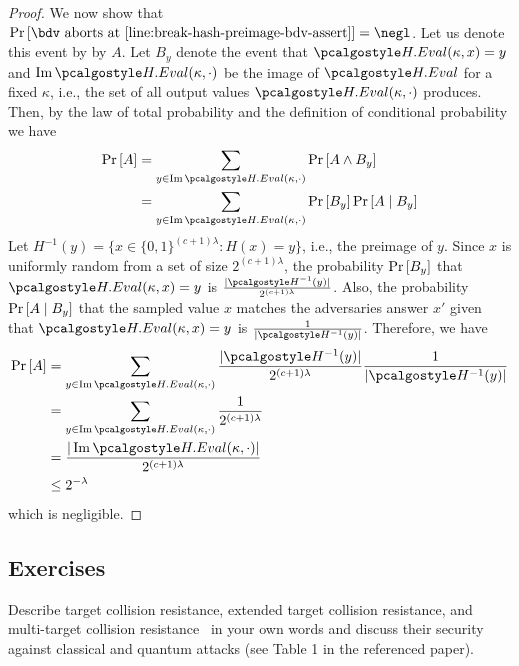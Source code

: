 \begin{proof}
  We now show that $\pr{\bdv \text{ aborts at \cref{line:break-hash-preimage-bdv-assert}} } = \negl$.
  Let us denote this event by by $A$.
  Let $B_y$ denote the event that $\algo{H.Eval}(\kappa, x) = y$ and $\Ima \algo{H.Eval}(\kappa, \cdot)$ be the image of $\algo{H.Eval}$ for a fixed $\kappa$, i.e., the set of all output values $\algo{H.Eval}(\kappa, \cdot)$ produces.
  Then, by the law of total probability and the definition of conditional probability we have
  \begin{align*}
    \pr{A} &= \sum_{y \in \Ima \algo{H.Eval}(\kappa, \cdot)} \pr{A \wedge B_y} \\
           &= \sum_{y \in \Ima \algo{H.Eval}(\kappa, \cdot)} \pr{B_y} \pr{A \mid B_y}
  \end{align*}
  Let $H^{-1}(y) = \{x \in \{0, 1\}^{(c+1)\lambda} : H(x) = y\}$, i.e., the preimage of $y$.
  Since $x$ is uniformly random from a set of size $2^{(c+1)\lambda}$, the probability $\Pr\left[ B_y \right]$ that $\algo{H.Eval}(\kappa, x) = y$ is $\frac{|\algo{H}^{-1}(y)|} {2^{(c+1)\lambda}}$.
  Also, the probability $\Pr\left[ A \mid B_y \right]$ that the sampled value $x$ matches the adversaries answer $x'$ given that $\algo{H.Eval}(\kappa, x) = y$ is $\frac{1}{|\algo{H}^{-1}(y)|}$.
  Therefore, we have
  \begin{align*}
    \pr{A} &= \sum_{y \in \Ima \algo{H.Eval}(\kappa, \cdot)} \frac{|\algo{H}^{-1}(y)|} {2^{(c+1)\lambda}} \frac{1}{|\algo{H}^{-1}(y)|}  \\
           &= \sum_{y \in \Ima \algo{H.Eval}(\kappa, \cdot)} \frac{1} {2^{(c+1)\lambda}} \\
           &= \frac{|\Ima \algo{H.Eval}(\kappa, \cdot)|} {2^{(c+1)\lambda}} \\
           &\le 2^{-\lambda} \\
  \end{align*}
  which is negligible.
\end{proof}

\subsection{Exercises}

\begin{exercise}[Optional]
  Describe target collision resistance, extended target collision resistance, and multi-target collision resistance~\cite{PKC:HulRijSon16} in your own words and discuss their security against classical and quantum attacks (see Table 1 in the referenced paper).
\end{exercise}
